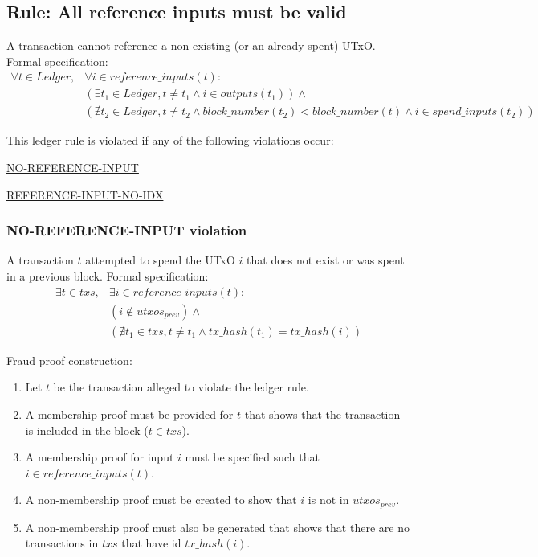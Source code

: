\documentclass[../midgard.tex]{subfiles}
\begin{document}
\subsection{Rule: All reference inputs must be valid}
\label{rule:all-reference-inputs-must-be-valid}

A transaction cannot reference a non-existing (or an already spent) UTxO. Formal specification:
\begin{equation*}
\begin{split}
    \forall t \in Ledger, &\forall i \in reference\_inputs(t): \\
    &( \exists t_1 \in Ledger, t \neq t_1 \land i \in outputs(t_1) ) \land \\
    &( \nexists t_2 \in Ledger, t \neq t_2 \land block\_number(t_2) < block\_number(t) \land i \in spend\_inputs(t_2) )
\end{split}
\end{equation*}

This ledger rule is violated if any of the following violations occur:
\begin{itemize-multi}
  \item \hyperref[violation:NO-REFERENCE-INPUT]{NO-REFERENCE-INPUT}
  \item \hyperref[violation:REFERENCE-INPUT-NO-IDX]{REFERENCE-INPUT-NO-IDX}
\end{itemize-multi}

\subsubsection{NO-REFERENCE-INPUT violation}
\label{violation:NO-REFERENCE-INPUT}
A transaction $t$ attempted to spend the UTxO $i$ that does not exist or was spent in a previous block.
Formal specification:
\begin{equation*}
\begin{split}
    \exists t \in txs, &\exists i \in reference\_inputs(t): \\
    &( i \notin utxos_{prev} ) \land  \\
    &( \nexists t_1 \in txs, t \neq t_1 \land tx\_hash(t_1) = tx\_hash(i) )
\end{split}
\end{equation*}

Fraud proof construction:
\begin{enumerate}
  \item Let $t$ be the transaction alleged to violate the ledger rule. 
  \item A membership proof must be provided for $t$ that shows that the transaction is included in the block ($t \in txs$).
  \item A membership proof for input $i$ must be specified such that $i \in reference\_inputs(t)$.
  \item A non-membership proof must be created to show that $i$ is not in $utxos_{prev}$.
  \item A non-membership proof must also be generated that shows that there are no transactions in $txs$ that have id $tx\_hash(i)$.
\end{enumerate}
\end{document}
